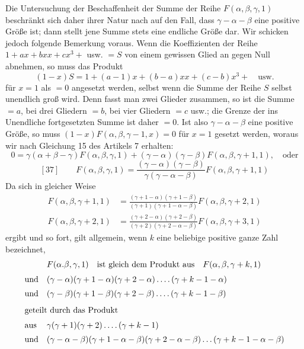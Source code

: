Die Untersuchung der Beschaffenheit der Summe der Reihe $F(\alpha,\beta,\gamma,1)$ beschränkt sich daher ihrer Natur nach auf den Fall, dass $\gamma-\alpha-\beta$ eine positive Größe ist; dann stellt jene Summe stets eine endliche Größe dar. Wir schicken jedoch folgende Bemerkung voraus. Wenn die Koeffizienten der Reihe $1+ax+bxx+cx^3+$ usw. $=S$ von einem gewissen Glied an gegen Null abnehmen, so muss das Produkt
\[
(1-x)S=1+(a-1)x+(b-a)xx+(c-b)x^3+\quad\text{usw.}
\]
für $x=1$ als $=0$ angesetzt werden, selbst wenn die Summe der Reihe $S$ selbst unendlich groß wird. Denn fasst man zwei Glieder zusammen, so ist die Summe $=a$, bei drei Gliedern $=b$, bei vier Gliedern $=c$ usw.; die Grenze der ins Unendliche fortgesetzten Summe ist daher $=0$. Ist also $\gamma-\alpha-\beta$ eine positive Größe, so muss $(1-x)F(\alpha,\beta,\gamma-1,x)=0$ für $x=1$ gesetzt werden, woraus wir nach Gleichung 15 des Artikels 7 erhalten:
\[
0=\gamma(\alpha+\beta-\gamma)F(\alpha,\beta,\gamma,1)+(\gamma-\alpha)(\gamma-\beta)F(\alpha,\beta,\gamma+1,1),\quad\text{oder}
\]
\[
[37]\qquad F(\alpha,\beta,\gamma,1)=\frac{(\gamma-\alpha)(\gamma-\beta)}{\gamma(\gamma-\alpha-\beta)}F(\alpha,\beta,\gamma+1,1)
\]
Da sich in gleicher Weise
\[
\begin{aligned}
F(\alpha,\beta,\gamma+1,1)&=\frac{(\gamma+1-\alpha)(\gamma+1-\beta)}{(\gamma+1)(\gamma+1-\alpha-\beta)}F(\alpha,\beta,\gamma+2,1)\\[6pt]
F(\alpha,\beta,\gamma+2,1)&=\frac{(\gamma+2-\alpha)(\gamma+2-\beta)}{(\gamma+2)(\gamma+2-\alpha-\beta)}F(\alpha,\beta,\gamma+3,1)
\end{aligned}
\]
ergibt und so fort, gilt allgemein, wenn $k$ eine beliebige positive ganze Zahl bezeichnet,
\[
\begin{array}{@{}ll@{}}
&F(\alpha.\beta,\gamma,1)\quad\text{ist gleich dem Produkt aus}\quad F(\alpha,\beta,\gamma+k,1)\\[6pt]
\text{und}&(\gamma-\alpha)(\gamma+1-\alpha)(\gamma+2-\alpha)\mathinner{.\,.\,.\,.}(\gamma+k-1-\alpha)\\[5pt]
\text{und}&(\gamma-\beta)(\gamma+1-\beta)(\gamma+2-\beta)\mathinner{.\,.\,.\,.}(\gamma+k-1-\beta)\\[8pt]
\multicolumn{2}{@{}l@{}}{\text{geteilt durch das Produkt}}\\[6pt]
\text{aus}&\gamma(\gamma+1)(\gamma+2)\mathinner{.\,.\,.\,.}(\gamma+k-1)\\[5pt]
\text{und}&(\gamma-\alpha-\beta)(\gamma+1-\alpha-\beta)(\gamma+2-\alpha-\beta)\mathinner{.\,.\,.}(\gamma+k-1-\alpha-\beta)
\end{array}
\]

